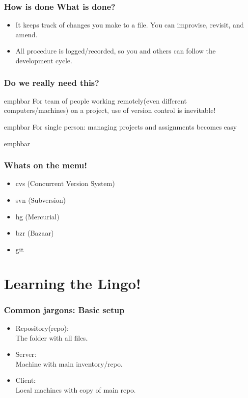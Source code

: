 \documentclass[14pt,compress]{beamer}
\newcommand{\emphbar}[1]
{\begin{beamercolorbox}[rounded=true]{emphbar} 
      {#1}
 \end{beamercolorbox}
}
\newcounter{time}
\newcommand{\inctime}[1]{\addtocounter{time}{#1}{\tiny \thetime\ m}}
\begin{document}
\begin{frame}
  \frametitle{How is done What is done?}
  \begin{itemize}
  \item It keeps track of changes you make to a file. You can improvise, revisit, and amend.
  \item All procedure is logged/recorded, so you and others can follow the development cycle.
  \end{itemize}  
\end{frame}

\begin{frame}
  \frametitle{Do we really need this?}
  \emphbar{For team of people working remotely(even different computers/machines) on a project, use of version control is inevitable!}
  \vspace{0.15in}
  \emphbar{For single person: managing projects and assignments becomes easy}
  \vspace{0.15in}
  \pause
  \emphbar{\color{red}{It is a good habit!}}
\end{frame}

\begin{frame}
  \frametitle{Whats on the menu!}
  \begin{itemize}
  \item cvs (Concurrent Version System)
  \item svn (Subversion)
  \item hg (Mercurial)
  \item bzr (Bazaar)
  \item git
  \end{itemize}
  \inctime{10}
\end{frame}

\section{Learning the Lingo!}

\begin{frame}
  \frametitle{Common jargons: Basic setup}
  \begin{itemize}
  \item Repository(repo):\\
        The folder with all files.
  \item Server:\\
        Machine with main inventory/repo.
  \item Client:\\
        Local machines with copy of main repo.
  \end{itemize}
\end{frame}
\end{document}
